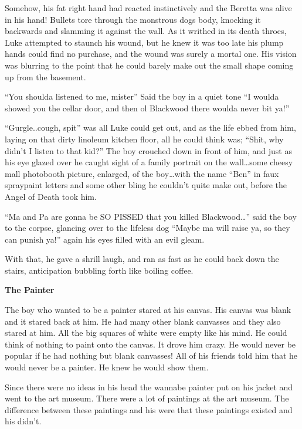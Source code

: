 Somehow, his fat right hand had reacted instinctively and the
Beretta was alive in his hand! Bullets tore through the monstrous
dogs body, knocking it backwards and slamming it against the wall.
As it writhed in its death throes, Luke attempted to staunch his
wound, but he knew it was too late his plump hands could find no
purchase, and the wound was surely a mortal one. His vision was
blurring to the point that he could barely make out the small shape
coming up from the basement.

``You shoulda listened to me, mister'' Said the boy in a quiet tone
``I woulda showed you the cellar door, and then ol Blackwood there
woulda never bit ya!''

``Gurgle..cough, spit'' was all Luke could get out, and as the life
ebbed from him, laying on that dirty linoleum kitchen floor, all he
could think was; ``Shit, why didn't I listen to that kid?'' The boy
crouched down in front of him, and just as his eye glazed over he
caught sight of a family portrait on the wall{\ldots}some cheesy mall
photobooth picture, enlarged, of the boy{\ldots}with the name ``Ben'' in
faux spraypaint letters and some other bling he couldn't quite make
out, before the Angel of Death took him.

``Ma and Pa are gonna be SO PISSED that you killed Blackwood{\ldots}''
said the boy to the corpse, glancing over to the lifeless dog
``Maybe ma will raise ya, so they can punish ya!'' again his eyes
filled with an evil gleam.

With that, he gave a shrill laugh, and ran as fast as he could back
down the stairs, anticipation bubbling forth like boiling coffee. 

 





{\bf The Painter}



The boy who wanted to be a painter stared at his canvas. His canvas
was blank and it stared back at him. He had many other blank
canvasses and they also stared at him. All the big squares of white
were empty like his mind. He could think of nothing to paint onto
the canvas. It drove him crazy. He would never be popular if he had
nothing but blank canvasses! All of his friends told him that he
would never be a painter. He knew he would show them.



Since there were no ideas in his head the wannabe painter put on
his jacket and went to the art museum. There were a lot of
paintings at the art museum. The difference between these paintings
and his were that these paintings existed and his didn't.


